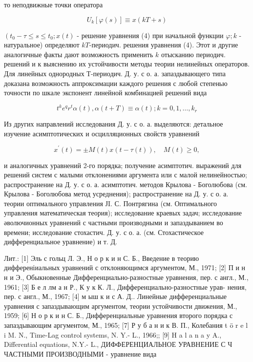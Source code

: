 \documentclass[10pt]{article}
\begin{document}
то неподвижные точки оператора



\[

U_{k}[\varphi(s)] \equiv x(k T+s)

\]



$\left(t_{0}-\tau \leqslant s \leqslant t_{0} ; x(t)\right.$ - решение уравнения (4) при начальной функции $\varphi ; k$ - натуральное) определяют $k T$-периодич. решения уравнения (4). Этот и другие аналогичные факты дают возможность применить $k$ отысканию периодич. решений и к выяснению их устойчивости методы теории нелинейных операторов. Для линейных однородных Т-периодич. Д. у. с о. а. запаздывающего типа доказана возможность аппроксимации каждого решения с любой степенью точности по шкале экспонент линейной комбинацией решений вида



\[

t^{k} e^{q} r^{t} \alpha(t), \alpha(t+T) \equiv \alpha(t) ; k=0,1, \ldots, k_{r}

\]



Из других направлений исследования Д. у. с о. а. выделяются: детальное изучение асимптотических и осцилляционных свойств уравнений



\[

x^{\prime}(t)= \pm M(t) x(t-\tau(t)), \quad M(t) \geqslant 0,

\]



и аналогичных уравнений 2-го порядка; получение асимптотич. выражений для решений систем с малыми отклонениями аргумента или с малой нелинейностью; распространение на Д. у. с о. а. асимптотич. методов Крылова - Боголюбова (см. Крылова - Боголюбова метод усреднения); распространение на Д. у. с о. а. теории оптимального управления ЈI. С. Понтрягина (см. Оптимального управления математическая теория); исследование краевых задач; исследование әволючионных уравнений с частными производными и запаздыванием во времени; исследование стохастич. Д. у. с о. а. (см. Стохастическое дифференциальное уравнение) и т. Д.



Лит.: [1] Эль с гольц Л. Э., Н о р к и н С. Б., Введение в теорию дифференіиальных уравнений с отклоняющимся аргументом, М., 1971; [2] П и н н и Э., Обыкновенные Дифференциально-разностные уравнения, пер. с англ., М., 1961; [3] Б е л лм а н Р., К у к К. Л., Дифференциально-разностные урав- нения, пер. с англ., М., 1967; [4] м ыш к и с А. Д.. Линейные дифференциальные уравнения с запаздывающим аргументом, теории устойчивости движения, М., 1959; [6] Н о р к и н С. Б., Дифференциальные уравнения второго порядка с запаздывающим аргументом, М., 1965; [7] Р у б а н и к В. П., Колебания t ö r e l i M. N., Time-Lag control systems, N. Y.- L., 1966;; [9] H a l a n a y A., Differential equations, N.Y.- L., ДИФФЕРЕНЦИАЛЬНОЕ УРАВНЕНИЕ С Ч ЧАСТНЫМИ ПРОИЗВОДНЫМИ - уравнение вида
\end{document}
